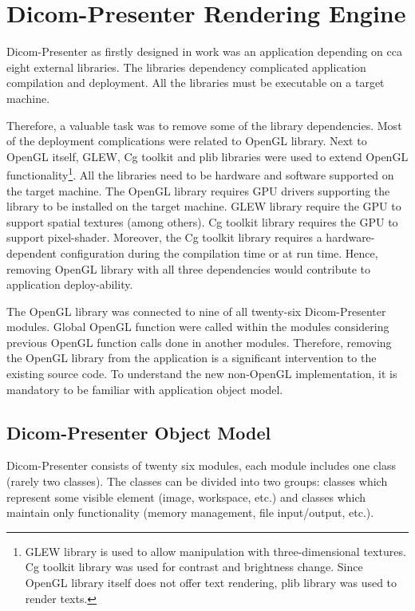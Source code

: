 \chapter{Dicom-Presenter Rendering Engine}
\vspace{-10mm}
Dicom-Presenter as firstly designed in work \cite{neskudla} was an application depending on cca eight external libraries. The libraries dependency complicated application compilation and deployment. All the libraries must be executable on a target machine.

Therefore, a valuable task was to remove some of the library dependencies. Most of the deployment complications were related to OpenGL library. Next to OpenGL itself, GLEW, Cg toolkit and plib libraries were used to extend OpenGL functionality\footnote{GLEW library is used to allow manipulation with three-dimensional textures. Cg toolkit library was used for contrast and brightness change. Since OpenGL library itself does not offer text rendering, plib library was used to render texts.}. All the libraries need to be hardware and software supported on the target machine. The OpenGL library requires GPU drivers supporting the library to be installed on the target machine. GLEW library require the GPU to support spatial textures (among others). Cg toolkit library requires the GPU to support pixel-shader. Moreover, the Cg toolkit library requires a hardware-dependent configuration during the compilation time or at run time. Hence, removing OpenGL library with all three dependencies would contribute to application deploy-ability.

The OpenGL library was connected to nine of all twenty-six Dicom-Presenter modules. Global OpenGL function were called within the modules considering previous OpenGL function calls done in another modules. Therefore, removing the OpenGL library from the application is a significant intervention to the existing source code. To understand the new non-OpenGL implementation, it is mandatory to be familiar with application object model.

\section{Dicom-Presenter Object Model}
\label{dpobjectmodel}
Dicom-Presenter consists of twenty six modules, each module includes one class (rarely two classes). The classes can be divided into two groups: classes which represent some visible element (image, workspace, etc.) and classes which maintain only functionality (memory management, file input/output, etc.).

